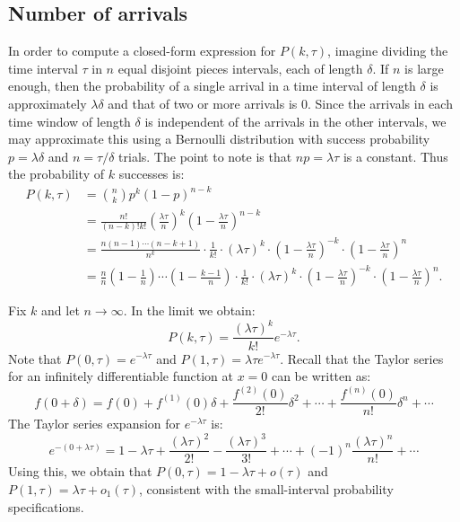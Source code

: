 \subsection{Number of arrivals}
In order to compute a closed-form expression for $P(k, \tau)$, imagine dividing the time interval $\tau$ in $n$ equal disjoint
pieces intervals, each of length $\delta$. If $n$ is large enough, then the probability of a single arrival in a time interval of length $\delta$
is approximately $\lambda \delta$ and that of two or more arrivals is $0$. Since the arrivals in each time window of length
$\delta$ is independent of the arrivals in the other intervals, we may approximate this using a Bernoulli distribution with
success probability $p = \lambda \delta$ and $n = \tau / \delta$ trials. The point to note is that $np = \lambda \tau$
is a constant. Thus the probability of $k$ successes is:
\begin{align*}
    P(k, \tau) & = {n \choose k} p^{k} (1 - p)^{n - k} \\
               & = \frac{n!}{(n - k)! k!} \left ( \frac{\lambda \tau}{n}\right )^k \left ( 1 - \frac{\lambda \tau}{n} \right )^{n - k} \\
               & = \frac{n (n - 1) \cdots (n - k + 1)}{n^k} \cdot \frac{1}{k!} \cdot (\lambda \tau)^{k}
                    \cdot \left ( 1 - \frac{\lambda \tau}{n} \right )^{-k} \cdot \left ( 1 - \frac{\lambda \tau}{n} \right )^{n} \\
               & = \frac{n}{n} \left ( 1 - \frac{1}{n} \right ) \cdots \left ( 1 - \frac{k - 1}{n} \right ) \cdot \frac{1}{k!} \cdot (\lambda \tau)^{k}
                    \cdot \left ( 1 - \frac{\lambda \tau}{n} \right )^{-k} \cdot \left ( 1 - \frac{\lambda \tau}{n} \right )^{n}.
\end{align*}

Fix $k$ and let $n \to \infty$. In the limit we obtain:
\[
    P(k, \tau) = \frac{(\lambda \tau)^k}{k!} e^{- \lambda \tau}.
\]
Note that $P(0, \tau) = e^{- \lambda \tau}$ and $P(1, \tau) = \lambda \tau e^{- \lambda \tau}$. Recall that the Taylor series
for an infinitely differentiable function at $x = 0$ can be written as:
\[
    f(0 + \delta) = f(0) + f^{(1)}(0) \delta + \frac{f^{(2)}(0)}{2!} \delta^2 + \cdots + \frac{f^{(n)}(0)}{n!} \delta^n + \cdots
\]
The Taylor series expansion for $e^{-\lambda \tau}$ is:
\[
    e^{-(0 + \lambda \tau)} = 1 - \lambda \tau + \frac{(\lambda \tau)^2}{2!} - \frac{(\lambda \tau)^3}{3!} +
                        \cdots + (-1)^n \frac{(\lambda \tau)^n}{n!} + \cdots
\]
Using this, we obtain that $P(0, \tau) =  1 - \lambda \tau + o(\tau)$ and $P(1, \tau) = \lambda \tau + o_1(\tau)$, consistent with
the small-interval probability specifications.

